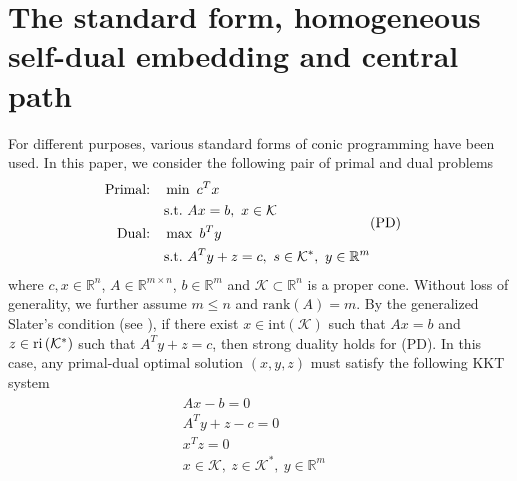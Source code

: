 \documentclass[10pt]{article}
\theoremstyle{definition}
\theoremstyle{plain}
\def\interior{\protect{\textnormal{ri}}}
\begin{document}
\section{The standard form, homogeneous self-dual embedding and central path}
For different purposes, various standard forms of conic programming have been used. In this paper, we consider the following pair of primal and dual problems
\begin{align}
\begin{split} 
\text{Primal:} \quad &\min\,\, c^Tx\\ 
&\textnormal{s.t.} \,\, Ax=b,\ x\in \mathcal{K} \\
\text{Dual:}  \quad &\max\,\, b^Ty \\
&\textnormal{s.t.} \,\, A^Ty+z=c,\ s\in\mathcal{K}^*,\ y \in \mathbb{R}^m \\
\end{split} &\text{(PD)} \nonumber
\end{align}
where $c,x \in \mathbb{R}^n$, $A\in \mathbb{R}^{m\times n}$, $b\in \mathbb{R}^m$ and $\mathcal{K} \subset \mathbb{R}^n$ is a proper cone. Without loss of generality, we further assume $m\leq n$ and $\text{rank}(A) = m$. By the generalized Slater's condition (see \cite{Boyd_Vander_Convex_Opt_Book}), if there exist
$x \in \text{int} \left(\mathcal{K}\right)$ such that $Ax=b$ and $z \in \interior \left(\mathcal{K}^*\right)$ such that $A^Ty+z=c$,
then strong duality holds for (PD). In this case, any primal-dual optimal solution $(x,y,z)$ must satisfy the following KKT system
\begin{align}\label{KKT_for_PD}
\begin{split}
Ax-b=0& \\
A^Ty+z-c=0& \\
x^Tz=0& \\
x\in\mathcal{K},\ z\in \mathcal{K}^*,\ y\in\mathbb{R}^m& 
\end{split}
\end{align}
\end{document}
